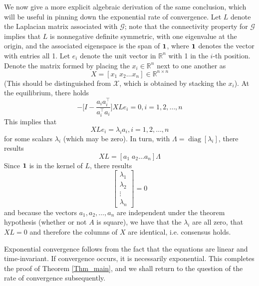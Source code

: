 \documentclass{aims}
\begin{document}
 We now give a more explicit algebraic derivation of the same conclusion, which will be useful in pinning down the exponential rate of convergence.
Let $L$ denote the Laplacian matrix associated with $\mathcal G$; note
that the connectivity property for $\mathcal G$ implies that $L$ is
nonnegative definite symmetric, with one eigenvalue at the origin, and
the associated eigenspace is the span of $ {\bf 1}$,
  where ${\bf{ 1}}$ denotes the vector with entries all 1. Let $e_i$
denote the unit vector in $\mathbb R^n$ with 1 in the $i$-th position. Denote the
matrix formed by placing the  $x_i \in \mathbb R^n$ next to one another as
 \begin{equation}
X=[x_1\;x_2\dots x_n] \in \mathbb R^{n\times n}
\end{equation}
(This should be distinguished from $\mathcal X$, which is obtained by stacking the $x_i$). At the equilibrium, there holds
\begin{equation}
-\big[I-\frac{a_ia_i^{\top}}{a_i^{\top}a_i}\big]XLe_i=0, i=1,2,\dots,n
\end{equation}
This implies that
\begin{equation}
XLe_i=\lambda_ia_i, i=1,2,\dots,n
\end{equation}
for some scalars $\lambda_i$ (which may be zero). In turn, with  $\Lambda=\operatorname{diag}[\lambda_i]$, there results
\begin{equation}
XL=[a_1\;a_2\dots a_n]\Lambda
\end{equation}
Since $\bf{1}$ is in the kernel of $L$, there results
\begin{equation}
[a_1\;a_2\dots a_n]\left[\begin{array}{c}\lambda_1\\\lambda_2\\\vdots\\\lambda_n\end{array}\right]=0
\end{equation}
and because the vectors $a_1,a_2,\ldots,a_n$ are independent under the theorem hypothesis (whether or not $A$ is square), we have that the $\lambda_i$ are all zero, that $XL=0$ and therefore the columns of $X$ are identical, i.e. consensus holds.


Exponential convergence follows from the fact that the equations are linear and time-invariant. If convergence occurs, it is necessarily exponential. This completes the proof of Theorem \ref{Thm_main}, and we shall return to the question of the rate of convergence subsequently.
\end{document}
